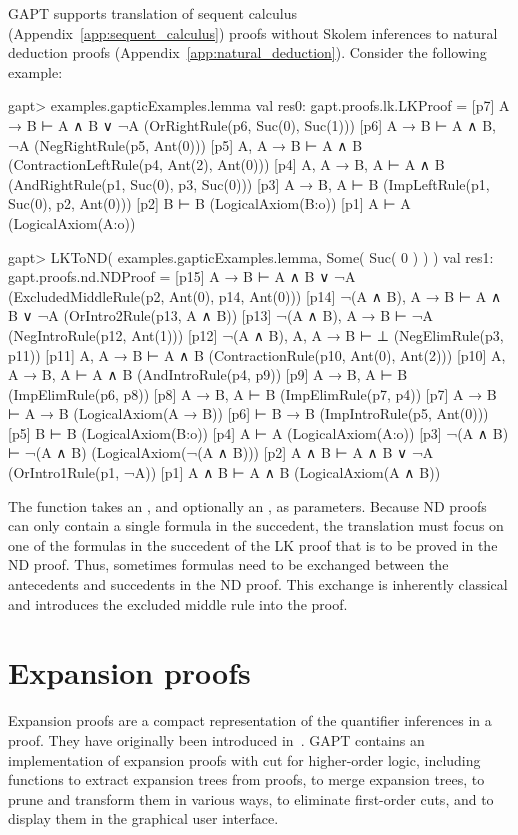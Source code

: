 \documentclass[a4paper,11pt]{book}
\newcommand{\cli}[1]{{\ttfamily {#1}}}
\begin{document}
GAPT supports translation of sequent calculus
(Appendix~\ref{app:sequent_calculus}) proofs without Skolem inferences
to natural deduction proofs (Appendix~\ref{app:natural_deduction}).
Consider the following example:
\begin{clilisting}
gapt> examples.gapticExamples.lemma
val res0: gapt.proofs.lk.LKProof =
[p7] A → B ⊢ A ∧ B ∨ ¬A    (OrRightRule(p6, Suc(0), Suc(1)))
[p6] A → B ⊢ A ∧ B, ¬A    (NegRightRule(p5, Ant(0)))
[p5] A, A → B ⊢ A ∧ B    (ContractionLeftRule(p4, Ant(2), Ant(0)))
[p4] A, A → B, A ⊢ A ∧ B    (AndRightRule(p1, Suc(0), p3, Suc(0)))
[p3] A → B, A ⊢ B    (ImpLeftRule(p1, Suc(0), p2, Ant(0)))
[p2] B ⊢ B    (LogicalAxiom(B:o))
[p1] A ⊢ A    (LogicalAxiom(A:o))

gapt> LKToND( examples.gapticExamples.lemma, Some( Suc( 0 ) ) )
val res1: gapt.proofs.nd.NDProof =
[p15] A → B ⊢ A ∧ B ∨ ¬A    (ExcludedMiddleRule(p2, Ant(0), p14, Ant(0)))
[p14] ¬(A ∧ B), A → B ⊢ A ∧ B ∨ ¬A    (OrIntro2Rule(p13, A ∧ B))
[p13] ¬(A ∧ B), A → B ⊢ ¬A    (NegIntroRule(p12, Ant(1)))
[p12] ¬(A ∧ B), A, A → B ⊢ ⊥    (NegElimRule(p3, p11))
[p11] A, A → B ⊢ A ∧ B    (ContractionRule(p10, Ant(0), Ant(2)))
[p10] A, A → B, A ⊢ A ∧ B    (AndIntroRule(p4, p9))
[p9] A → B, A ⊢ B    (ImpElimRule(p6, p8))
[p8] A → B, A ⊢ B    (ImpElimRule(p7, p4))
[p7] A → B ⊢ A → B    (LogicalAxiom(A → B))
[p6]  ⊢ B → B    (ImpIntroRule(p5, Ant(0)))
[p5] B ⊢ B    (LogicalAxiom(B:o))
[p4] A ⊢ A    (LogicalAxiom(A:o))
[p3] ¬(A ∧ B) ⊢ ¬(A ∧ B)    (LogicalAxiom(¬(A ∧ B)))
[p2] A ∧ B ⊢ A ∧ B ∨ ¬A    (OrIntro1Rule(p1, ¬A))
[p1] A ∧ B ⊢ A ∧ B    (LogicalAxiom(A ∧ B))

\end{clilisting}
The \cli{LKToND} function takes an \cli{LKProof}, and optionally an
\cli{Option[SequentIndex]}, as parameters.  Because ND proofs can only
contain a single formula in the succedent, the translation must focus on one
of the formulas in the succedent of the LK proof that is to be proved in the ND
proof.
Thus, sometimes formulas need to be exchanged between the antecedents and
succedents in the ND proof. This exchange is inherently classical and introduces
the excluded middle rule into the proof.

\section{Expansion proofs}

Expansion proofs are a compact representation of the quantifier inferences in a
proof.  They have originally been introduced in~\cite{Miller87Compact}.  GAPT
contains an implementation of expansion proofs with cut for higher-order logic,
including functions to extract expansion trees from proofs, to merge expansion
trees, to prune and transform them in various ways, to eliminate first-order
cuts, and to display them in the graphical user interface.
\end{document}
